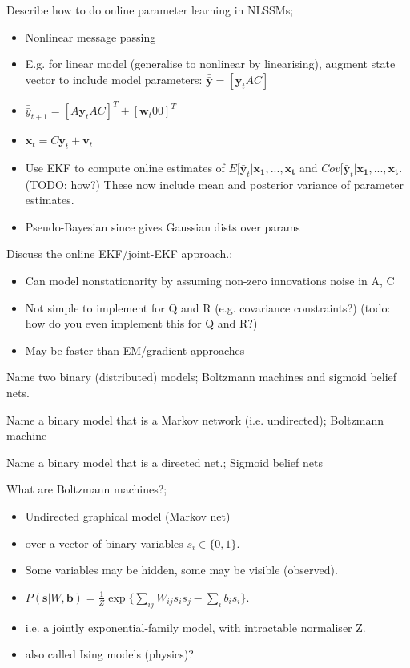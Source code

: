 \documentclass{article}
\begin{document}
Describe how to do online parameter learning in NLSSMs; \begin{itemize} \item Nonlinear message passing \item E.g. for linear model (generalise to nonlinear by linearising), augment state vector to include model parameters: $\bar{\bar{\mathbf{y}}}=[\mathbf{y}_t A C]$ \item $\bar{\bar{y}}_{t+1}=[A\mathbf{y}_t A C]^T + [\mathbf{w}_t 0 0 ]^T$ \item $\mathbf{x}_t=C\mathbf{y}_t+\mathbf{v}_t$ \item Use EKF to compute online estimates of $E[\bar{\bar{\mathbf{y}}}_t|\mathbf{x_1,...,x_t}$ and $Cov[\bar{\bar{\mathbf{y}}}_t|\mathbf{x_1,...,x_t}$. (TODO: how?) These now include mean and posterior variance of parameter estimates. \item Pseudo-Bayesian since gives Gaussian dists over params \end{itemize}

Discuss the online EKF/joint-EKF approach.; \begin{itemize} \item Can model nonstationarity by assuming non-zero innovations noise in A, C \item Not simple to implement for Q and R (e.g. covariance constraints?) (todo: how do you even implement this for Q and R?) \item May be faster than EM/gradient approaches \end{itemize}

Name two binary (distributed) models; Boltzmann machines and sigmoid belief nets.

Name a binary model that is a Markov network (i.e. undirected); Boltzmann machine

Name a binary model that is a directed net.; Sigmoid belief nets

What are Boltzmann machines?;\begin{itemize} \item Undirected graphical model (Markov net) \item over a vector of binary variables $s_i\in\{0, 1\}$. \item Some variables may be hidden, some may be visible (observed). \item $P(\mathbf{s}|W, \mathbf{b})=\frac{1}{Z}\exp\{\sum_{ij}W_{ij}s_is_j-\sum_ib_is_i\}$. \item i.e. a jointly exponential-family model, with intractable normaliser Z. \item also called Ising models (physics)? \end{itemize} 
\end{document}
